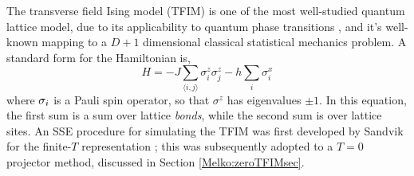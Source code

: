 \documentclass[vecphys]{svmult}
\begin{document}
The transverse field Ising model (TFIM) is one of the most well-studied quantum lattice model, due to its applicability to quantum phase transitions \cite{Melko:Sachdev11}, and it's well-known mapping to a $D+1$ dimensional classical statistical mechanics problem.  A standard form for the Hamiltonian is,
\begin{equation}
H = -J\sum_{\langle i,j \rangle} \sigma^z_i \sigma^z_j - h \sum_{i} \sigma^x_i
\end{equation}
where ${\bf \sigma}_i$ is a Pauli spin operator, so that $\sigma^z$ has eigenvalues $\pm 1$.  In this equation, the first sum is a sum over lattice {\em bonds}, while the second sum is over lattice sites.  An SSE procedure for simulating the TFIM was first developed by Sandvik for the finite-$T$ representation \cite{Melko:Sandvik03}; this was subsequently adopted to a $T=0$ projector method, discussed in Section \ref{Melko:zeroTFIMsec}.
\end{document}
